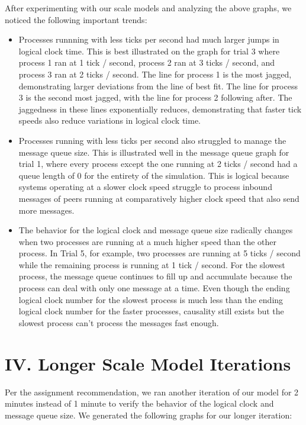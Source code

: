\documentclass[
	a4paper, %
	10pt, %
	unnumberedsections, %
	twoside, %
]{LTJournalArticle}
\begin{document}
\vspace{1mm}

After experimenting with our scale models and analyzing the above graphs, we noticed the following important trends: 
\begin{itemize}
    \item Processes runnning with less ticks per second had much larger jumps in logical clock time. This is best illustrated on the graph for trial 3 where process 1 ran at 1 tick / second, process 2 ran at 3 ticks / second, and process 3 ran at 2 ticks / second. The line for process 1 is the most jagged, demonstrating larger deviations  from the line of best fit. The line for process 3 is the second most jagged, with the line for process 2 following after. The jaggedness in these lines exponentially reduces, demonstrating that faster tick speeds also reduce variations in logical clock time. 
    \item Processes running with less ticks per second also struggled to manage the message queue size. This is illustrated well in the message queue graph for trial 1, where every process except the one running at 2 ticks / second had a queue length of 0 for the entirety of the simulation. This is logical because systems operating at a slower clock speed struggle to process inbound messages of peers running at comparatively higher clock speed that also send more messages.
    \item The behavior for the logical clock and message queue size radically changes when two processes are running at a much higher speed than the other process. In Trial 5, for example, two processes are running at 5 ticks / second while the remaining process is running at 1 tick / second. For the slowest process, the message queue continues to fill up and accumulate because the process can deal with only one message at a time. Even though the ending logical clock number for the slowest process is much less than the ending logical clock number for the faster processes, causality still exists but the slowest process can't process the messages fast enough.
\end{itemize}

\section{IV. Longer Scale Model Iterations}

Per the assignment recommendation, we ran another iteration of our model for 2 minutes instead of 1 minute to verify the behavior of the logical clock and message queue size. We generated the following graphs for our longer iteration: 
\end{document}
